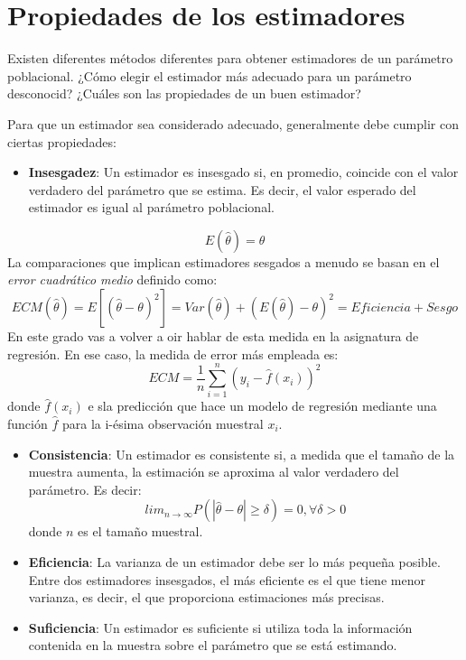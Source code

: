 \documentclass[
  letterpaper,
  DIV=11,
  numbers=noendperiod]{scrreprt}
\providecommand{\tightlist}{%
  \setlength{\itemsep}{0pt}\setlength{\parskip}{0pt}}\usepackage{longtable,booktabs,array}
\begin{document}
\hypertarget{propiedades-de-los-estimadores}{%
\section{Propiedades de los
estimadores}\label{propiedades-de-los-estimadores}}

Existen diferentes métodos diferentes para obtener estimadores de un
parámetro poblacional. ¿Cómo elegir el estimador más adecuado para un
parámetro desconocid? ¿Cuáles son las propiedades de un buen estimador?

Para que un estimador sea considerado adecuado, generalmente debe
cumplir con ciertas propiedades:

\begin{itemize}
\tightlist
\item
  \textbf{Insesgadez}: Un estimador es insesgado si, en promedio,
  coincide con el valor verdadero del parámetro que se estima. Es decir,
  el valor esperado del estimador es igual al parámetro poblacional.
\end{itemize}

\[E(\hat{\theta}) = \theta\] La comparaciones que implican estimadores
sesgados a menudo se basan en el \emph{error cuadrático medio} definido
como: \[
ECM(\hat{\theta})=E[(\hat{\theta}- \theta)^2]=Var(\hat{\theta})+(E(\hat{\theta})- \theta)^2=Eficiencia+  Sesgo
\] En este grado vas a volver a oir hablar de esta medida en la
asignatura de regresión. En ese caso, la medida de error más empleada
es: \[
ECM=\frac{1}{n}\sum_{i=1}^n(y_i-\hat{f}(x_i))^2
\] donde \(\hat{f}(x_i)\) e sla predicción que hace un modelo de
regresión mediante una función \(\hat{f}\) para la i-ésima observación
muestral \(x_i\).

\begin{itemize}
\item
  \textbf{Consistencia}: Un estimador es consistente si, a medida que el
  tamaño de la muestra aumenta, la estimación se aproxima al valor
  verdadero del parámetro. Es decir: \[
  lim_{n  \rightarrow \infty}P(|\hat{\theta}-\theta|\geq\delta)=0, \forall\delta>0
  \] donde \(n\) es el tamaño muestral.
\item
  \textbf{Eficiencia}: La varianza de un estimador debe ser lo más
  pequeña posible. Entre dos estimadores insesgados, el más eficiente es
  el que tiene menor varianza, es decir, el que proporciona estimaciones
  más precisas.
\item
  \textbf{Suficiencia}: Un estimador es suficiente si utiliza toda la
  información contenida en la muestra sobre el parámetro que se está
  estimando.
\end{itemize}
\end{document}
